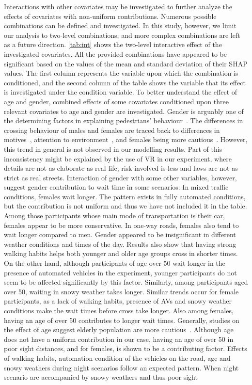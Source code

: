 Interactions with other covariates may be investigated to further analyze the effects of covariates with non-uniform contributions. Numerous possible combinations can be defined and investigated. In this study, however, we limit our analysis to two-level combinations, and more complex combinations are left as a future direction. \cref{tab:int} shows the two-level interactive effect of the investigated covariates. All the provided combinations have appeared to be significant based on the values of the mean and standard deviation of their SHAP values. The first column represents the variable upon which the combination is conditioned, and the second column of the table shows the variable that its effect is investigated under the condition variable. To better understand the effect of age and gender, combined effects of some covariates conditioned upon three relevant covariates to age and gender are investigated. Gender is arguably one of the determining factors in explaining pedestrians' behaviour~\cite{rasouli2019autonomous,hamed2001analysis}. The differences in crossing behaviour of males and females are traced back to differences in motives~\citep{yagil2000beliefs}, attention to environment~\citep{tom2011gender}, and females being more cautious~\citep{holland2007effect}. However, this trend in general is not observed in our modelling results. Part of this inconsistency might be explained by the use of VR in our experiment, where details are not as elaborate as real life, risk involved is less and laws are not as strict as real streets. Interaction of gender with some other variables, however, suggest gender contribution to wait time in some scenarios: In mixed traffic conditions, females wait longer. The pattern exists in fully automated conditions, but the contribution is not uniform and thus we have not included it in the table. Among those participants whose main mode of transportation is their car, females appear to be more conservative. In one-way roads, females also tend to wait longer compared to men. Gender appeared to be insignificant in different weather conditions and times of the day. Results also show that having strong walking habits helps both younger and older age groups cross in shorter times. On the other hand, although participants of age over 50 wait longer in the presence of automated vehicles in the experiment, younger participants do not seem to be affected significantly by this factor. Similarly, among participants aged over 50, waiting in snowy weather takes longer. Similar trends occur for female participants, as a lack of walking habits, presence of AVs and snowy weather conditions make the wait times before cross take longer. Also among females, having an age of over 50 contributes to longer wait times. Generally, studies on the effect of age suggest elderly population are more cautious~\citep{sun2003modeling,harrell1991precautionary,hamed2001analysis}. Although age does not have a uniform contribution in our case, having an age of over 50 in poor sight distances, and for females, is shown to be a contributing factor.  Effects of walking habits, automation condition of the vehicles on the road, age and snowy weathers during night scenarios follow an expected pattern. When night scenario are accompanied by snowy weathers and thus poor sight 